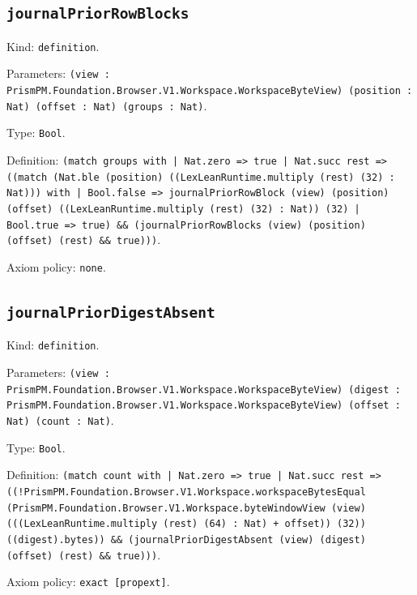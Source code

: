 \documentclass[11pt]{article}
\begin{document}
\subsection*{\texttt{journalPriorRowBlocks}}
\noindent Kind: \texttt{definition}.\par
\noindent Parameters: \texttt{(view : PrismPM.Foundation.Browser.V1.Workspace.WorkspaceByteView) (position : Nat) (offset : Nat) (groups : Nat)}.\par
\noindent Type: \texttt{Bool}.\par
\noindent Definition: \texttt{(match groups with | Nat.zero => true | Nat.succ rest => ((match (Nat.ble (position) ((LexLeanRuntime.multiply (rest) (32) : Nat))) with | Bool.false => journalPriorRowBlock (view) (position) (offset) ((LexLeanRuntime.multiply (rest) (32) : Nat)) (32) | Bool.true => true) \&\& (journalPriorRowBlocks (view) (position) (offset) (rest) \&\& true)))}.\par
\noindent Axiom policy: \texttt{none}.\par
\subsection*{\texttt{journalPriorDigestAbsent}}
\noindent Kind: \texttt{definition}.\par
\noindent Parameters: \texttt{(view : PrismPM.Foundation.Browser.V1.Workspace.WorkspaceByteView) (digest : PrismPM.Foundation.Browser.V1.Workspace.WorkspaceByteView) (offset : Nat) (count : Nat)}.\par
\noindent Type: \texttt{Bool}.\par
\noindent Definition: \texttt{(match count with | Nat.zero => true | Nat.succ rest => ((!PrismPM.Foundation.Browser.V1.Workspace.workspaceBytesEqual (PrismPM.Foundation.Browser.V1.Workspace.byteWindowView (view) (((LexLeanRuntime.multiply (rest) (64) : Nat) + offset)) (32)) ((digest).bytes)) \&\& (journalPriorDigestAbsent (view) (digest) (offset) (rest) \&\& true)))}.\par
\noindent Axiom policy: \texttt{exact [propext]}.\par
\end{document}
